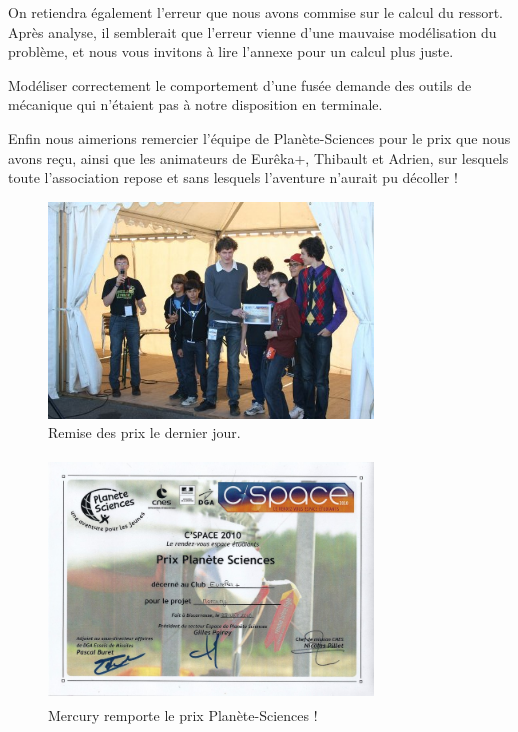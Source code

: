 \documentclass[a4paper,12pt]{scrartcl}
\begin{document}
	  On retiendra également l'erreur que nous avons commise sur le calcul du ressort. Après analyse, il semblerait que l'erreur vienne d'une mauvaise modélisation du problème, et nous vous invitons à lire l'annexe pour un calcul plus juste.

	  Modéliser correctement le comportement d'une fusée demande des outils de mécanique qui n'étaient pas à notre disposition en terminale.
	  
	  Enfin nous aimerions remercier l'équipe de Planète-Sciences pour le prix que nous avons reçu, ainsi que les animateurs de Eurêka+, Thibault et Adrien, sur lesquels toute l'association repose et sans lesquels l'aventure n'aurait pu décoller !

	  
	      \begin{figure}[H]
		    \begin{center}
		      \caption{Remise des prix le dernier jour.}
		      \includegraphics[height=217px, width=326px]{Photos_Mercury/remise_des_prix.jpg}
		    \end{center}
	      \end{figure}
	      \begin{figure}[H]
		    \begin{center}
		      \caption{Mercury remporte le prix Planète-Sciences !}
		      \includegraphics[height=244px, width=326px]{Photos_Mercury/Mercury_Prix_PS_2010.jpg}
		    \end{center}
	      \end{figure}
	\newpage
\end{document}

